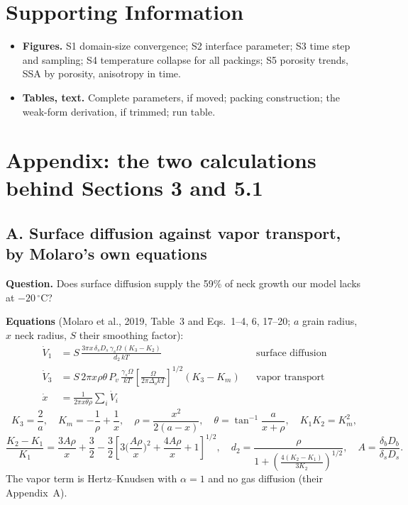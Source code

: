 \documentclass[11pt]{article}
\begin{document}
\section*{Supporting Information}
\begin{itemize}
\item \textbf{Figures.} S1 domain-size convergence; S2 interface parameter;
  S3 time step and sampling; S4 temperature collapse for all packings; S5
  porosity trends, SSA by porosity, anisotropy in time.
\item \textbf{Tables, text.} Complete parameters, if moved; packing
  construction; the weak-form derivation, if trimmed; run table.
\end{itemize}

\section*{Appendix: the two calculations behind Sections 3 and 5.1}

\subsection*{A. Surface diffusion against vapor transport, by Molaro's own equations}

\textbf{Question.} Does surface diffusion supply the 59\% of neck growth our
model lacks at $-20\,^{\circ}$C?

\textbf{Equations} (Molaro et al., 2019, Table~3 and Eqs.~1--4, 6, 17--20;
$a$ grain radius, $x$ neck radius, $S$ their smoothing factor):
\begin{align*}
\dot V_1 &= S\,\frac{3\pi x\,\delta_sD_s\,\gamma_s\Omega\,(K_3 - K_2)}{d_2\,kT} && \text{surface diffusion}\\
\dot V_3 &= S\,2\pi x\rho\theta\,P_v\,\frac{\gamma_s\Omega}{kT}\left[\frac{\Omega}{2\pi\Delta_o kT}\right]^{1/2}(K_3 - K_m) && \text{vapor transport}\\
\dot x &= \frac{1}{2\pi x\theta\rho}\sum_i\dot V_i
\end{align*}
\[
K_3 = \frac{2}{a},\quad K_m = -\frac1\rho + \frac1x,\quad \rho = \frac{x^{2}}{2(a-x)},\quad \theta = \tan^{-1}\frac{a}{x+\rho},\quad K_1K_2 = K_m^{2},
\]
\[
\frac{K_2-K_1}{K_1} = \frac{3A\rho}{x} + \frac32 - \frac32\left[3\Big(\frac{A\rho}{x}\Big)^{2} + \frac{4A\rho}{x} + 1\right]^{1/2},\quad
d_2 = \frac{\rho}{1 + \left(\frac{4(K_2-K_1)}{3K_2}\right)^{1/2}},\quad A = \frac{\delta_bD_b}{\delta_sD_s} .
\]
The vapor term is Hertz--Knudsen with $\alpha = 1$ and no gas diffusion
(their Appendix~A).
\end{document}
